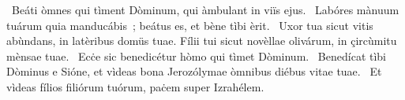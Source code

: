 ~Beáti òmnes qui tìment Dòminum, qui àmbulant in viïs ejus. 
~Labóres mànuum tuárum quia manducábis~; beátus es, et bène tìbi èrit. 
~Uxor tua sicut vitis abùndans, in latèribus domüs tuae. Fílii tui sicut novèllae olivárum, in çircùmitu mènsae tuae. 
~Ecċe sic benedicétur hòmo qui tìmet Dòminum. 
~Benedícat tìbi Dòminus e Sióne, et vìdeas bona Jerozólymae òmnibus diébus vitae tuae. 
~Et vìdeas fílios filiórum tuórum, paċem super Izrahélem. 
